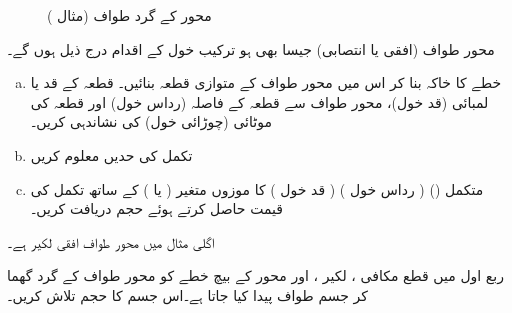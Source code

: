 \begin{figure}
\begin{subfigure}{0.45\textwidth}
\caption{}
\end{subfigure}
\caption{محور  کے گرد طواف (مثال )}
\label{شکل_مثال_تکمل_استعمال_پہلے_بھی-حل}
\end{figure}

محور طواف (افقی یا انتصابی) جیسا بھی ہو ترکیب خول کے اقدام درج ذیل ہوں گے۔
\begin{enumerate}[a.]
\item
خطے کا خاکہ بنا کر اس میں محور طواف کے متوازی قطعہ بنائیں۔ قطعہ کے  قد یا لمبائی (قد خول)،  محور طواف سے قطعہ کے  فاصلہ (رداس خول) اور قطعہ کی موٹائی (چوڑائی خول) کی نشاندہی کریں۔
\item
تکمل کی حدیں معلوم کریں
\item
متکمل () ( رداس خول ) ( قد خول )  کا موزوں متغیر ( یا ) کے ساتھ تکمل کی قیمت حاصل کرتے ہوئے حجم دریافت کریں۔
\end{enumerate} 

اگلی مثال میں محور طواف افقی لکیر  ہے۔

ربع اول میں قطع مکافی ، لکیر ،  اور محور  کے بیچ خطے کو محور طواف  کے گرد گھما کر جسم طواف پیدا کیا جاتا ہے۔اس جسم کا حجم تلاش کریں۔

